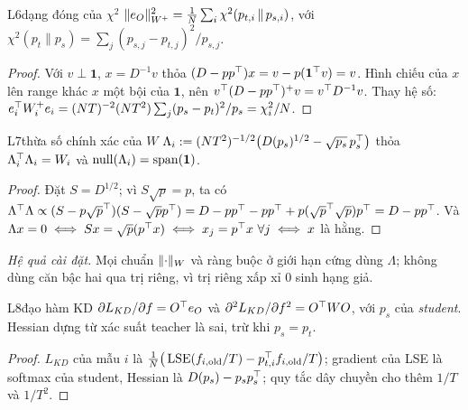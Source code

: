 \begin{namedthm}{L6}{dạng đóng của $\chi^2$}
$\lVert e_O\rVert_{W^+}^2=\frac1N\sum_i\chi^2(p_{t,i}\,\|\,p_{s,i})$, với $\chi^2(p_t\|p_s)=\sum_j(p_{s,j}-p_{t,j})^2/p_{s,j}$.
\end{namedthm}
\begin{proof}
Với $v\perp\mathbf 1$, $x=D^{-1}v$ thỏa $(D-pp^{\top})x=v-p(\mathbf 1^{\top} v)=v$. Hình chiếu của $x$ lên range khác $x$ một bội của $\mathbf 1$, nên $v^{\top}(D-pp^{\top})^+v=v^{\top} D^{-1}v$. Thay hệ số: $e_i^{\top} W_i^+e_i=(NT)^{-2}(NT^2)\sum_j(p_s-p_t)^2/p_s=\chi^2_i/N$.
\end{proof}

\begin{namedthm}{L7}{thừa số chính xác của $W$}
$\Lambda_i:=(NT^2)^{-1/2}\big(D(p_s)^{1/2}-\sqrt{p_s}\,p_s^{\top}\big)$ thỏa $\Lambda_i^{\top}\Lambda_i=W_i$ và $\operatorname{null}(\Lambda_i)=\operatorname{span}(\mathbf 1)$.
\end{namedthm}
\begin{proof}
Đặt $S=D^{1/2}$; vì $S\sqrt p=p$, ta có $\Lambda^{\top}\Lambda\propto(S-p\sqrt p^{\top})(S-\sqrt pp^{\top})=D-pp^{\top}-pp^{\top}+p(\sqrt p^{\top}\sqrt p)p^{\top}=D-pp^{\top}$. Và $\Lambda x=0\iff Sx=\sqrt p(p^{\top} x)\iff x_j=p^{\top} x\ \forall j\iff x$ là hằng.
\end{proof}
\noindent\emph{Hệ quả cài đặt.} Mọi chuẩn $\lVert \cdot\rVert_W$ và ràng buộc ở giới hạn cứng dùng $\Lambda$; không dùng căn bậc hai qua trị riêng, vì trị riêng xấp xỉ $0$ sinh hạng giả.

\begin{namedthm}{L8}{đạo hàm KD}
$\partial L_{KD}/\partial f=O^{\top} e_O$ và $\partial^2L_{KD}/\partial f^2=O^{\top} WO$, với $p_s$ của \emph{student}. Hessian dựng từ xác suất teacher là sai, trừ khi $p_s=p_t$.
\end{namedthm}
\begin{proof}
$L_{KD}$ của mẫu $i$ là $\frac1N\big(\operatorname{LSE}(f_{i,\mathrm{old}}/T)-p_{t,i}^{\top} f_{i,\mathrm{old}}/T\big)$; gradient của LSE là softmax của student, Hessian là $D(p_s)-p_sp_s^{\top}$; quy tắc dây chuyền cho thêm $1/T$ và $1/T^2$.
\end{proof}

